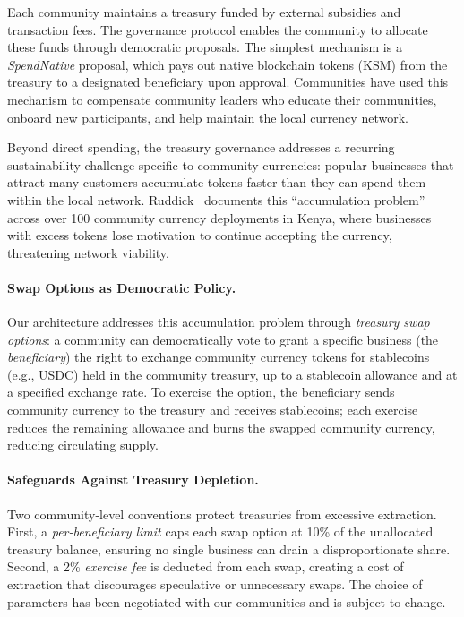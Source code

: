 \documentclass{svproc}
\begin{document}
Each community maintains a treasury funded by external subsidies and transaction fees. The governance protocol enables the community to allocate these funds through democratic proposals. The simplest mechanism is a \emph{SpendNative} proposal, which pays out native blockchain tokens (KSM) from the treasury to a designated beneficiary upon approval. Communities have used this mechanism to compensate community leaders who educate their communities, onboard new participants, and help maintain the local currency network.

Beyond direct spending, the treasury governance addresses a recurring sustainability challenge specific to community currencies: popular businesses that attract many customers accumulate tokens faster than they can spend them within the local network. Ruddick~\cite{ruddick2022grassroots} documents this ``accumulation problem'' across over 100 community currency deployments in Kenya, where businesses with excess tokens lose motivation to continue accepting the currency, threatening network viability.

\paragraph{Swap Options as Democratic Policy.}
Our architecture addresses this accumulation problem through \emph{treasury swap options}: a community can democratically vote to grant a specific business (the \emph{beneficiary}) the right to exchange community currency tokens for stablecoins (e.g., USDC) held in the community treasury, up to a stablecoin allowance and at a specified exchange rate. To exercise the option, the beneficiary sends community currency to the treasury and receives stablecoins; each exercise reduces the remaining allowance and burns the swapped community currency, reducing circulating supply.

\paragraph{Safeguards Against Treasury Depletion.}
Two community-level conventions protect treasuries from excessive extraction. First, a \emph{per-beneficiary limit} caps each swap option at 10\% of the unallocated treasury balance, ensuring no single business can drain a disproportionate share. Second, a 2\% \emph{exercise fee} is deducted from each swap, creating a cost of extraction that discourages speculative or unnecessary swaps. The choice of parameters has been negotiated with our communities and is subject to change.
\end{document}
